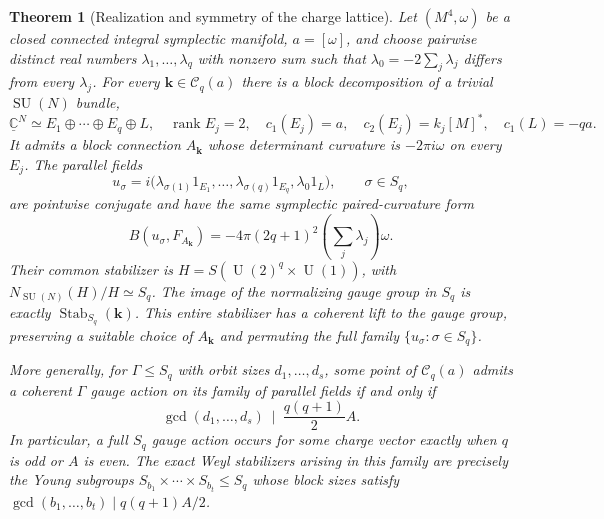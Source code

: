 \documentclass[11pt]{amsart}
\newcommand{\SU}{\operatorname{SU}}
\newcommand{\U}{\operatorname{U}}
\newcommand{\C}{\mathbb C}
\theoremstyle{plain}
\newtheorem{theorem}{Theorem}[section]
\theoremstyle{definition}
\theoremstyle{remark}
\begin{document}
\begin{theorem}[Realization and symmetry of the charge lattice]\label{thm:charge-lattice}
Let $(M^4,\omega)$ be a closed connected integral symplectic manifold,
$a=[\omega]$, and choose pairwise distinct real numbers
$\lambda_1,\ldots,\lambda_q$ with nonzero sum such that
$\lambda_0=-2\sum_j\lambda_j$ differs from every $\lambda_j$.
For every $\mathbf k\in\mathcal C_q(a)$ there is a block decomposition of a
\emph{trivial} $\SU(N)$ bundle,
\[
 \underline{\C}^{N}\simeq E_1\oplus\cdots\oplus E_q\oplus L,
 \quad \operatorname{rank}E_j=2,\quad
 c_1(E_j)=a,\quad c_2(E_j)=k_j[M]^*,\quad c_1(L)=-qa.
\]
It admits a block connection $A_{\mathbf k}$ whose determinant curvature
is $-2\pi i\omega$ on every $E_j$. The parallel fields
\[
 u_\sigma=i\bigl(\lambda_{\sigma(1)}1_{E_1},\ldots,
 \lambda_{\sigma(q)}1_{E_q},\lambda_0 1_L\bigr),
 \qquad \sigma\in S_q,
\]
are pointwise conjugate and have the same symplectic paired-curvature form
\begin{equation}\label{eq:charge-beta}
 B(u_\sigma,F_{A_{\mathbf k}})
 =-4\pi(2q+1)^2\left(\sum_j\lambda_j\right)\omega.
\end{equation}
Their common stabilizer is $H=S(\U(2)^q\times\U(1))$, with
$N_{\SU(N)}(H)/H\simeq S_q$. The image of the normalizing gauge group
in $S_q$ is exactly $\operatorname{Stab}_{S_q}(\mathbf k)$. This entire
stabilizer has a coherent lift to the gauge group, preserving a suitable
choice of $A_{\mathbf k}$ and permuting the full family
$\{u_\sigma:\sigma\in S_q\}$.

More generally, for $\Gamma\leq S_q$ with orbit sizes $d_1,\ldots,d_s$,
some point of $\mathcal C_q(a)$ admits a coherent $\Gamma$ gauge action
on its family of parallel fields if
and only if
\begin{equation}\label{eq:charge-gcd}
 \gcd(d_1,\ldots,d_s)\ \mid\ \frac{q(q+1)}2 A.
\end{equation}
In particular, a full $S_q$ gauge action occurs for some charge vector
exactly when $q$ is odd or $A$ is even.
The exact Weyl stabilizers arising in this family are precisely the
Young subgroups $S_{b_1}\times\cdots\times S_{b_t}\leq S_q$ whose block
sizes satisfy
$\gcd(b_1,\ldots,b_t)\mid q(q+1)A/2$.
\end{theorem}
\end{document}
